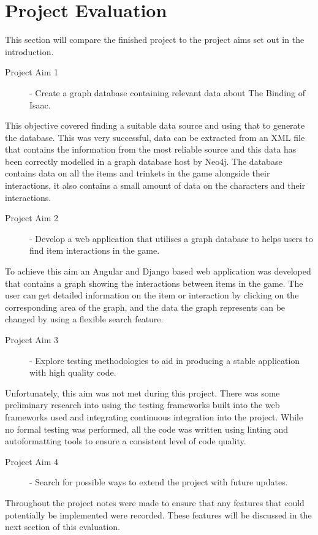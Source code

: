 \section{Project Evaluation}
This section will compare the finished project to the project aims set out in the introduction.
\begin{description}
    \item[Project Aim 1] - Create a graph database containing relevant data about The Binding of Isaac.
\end{description}
This objective covered finding a suitable data source and using that to generate the database. This was very successful, data can be 
extracted from an XML file that contains the information from the most reliable source and this data has been correctly modelled in 
a graph database host by Neo4j. The database contains data on all the items and trinkets in the game alongside their interactions, it also 
contains a small amount of data on the characters and their interactions.
\begin{description}
    \item[Project Aim 2] - Develop a web application that utilises a graph database to helps users to find item interactions in the game.
\end{description}
To achieve this aim an Angular and Django based web application was developed that contains a graph showing the interactions between items in the game. 
The user can get detailed information on the item or interaction by clicking on the corresponding area of the graph, and the data the graph represents can be 
changed by using a flexible search feature.
\begin{description}
    \item[Project Aim 3] - Explore testing methodologies to aid in producing a stable application with high quality code.
\end{description}
Unfortunately, this aim was not met during this project. There was some preliminary research into using the testing frameworks built into the 
web frameworks used and integrating continuous integration into the project. While no formal testing was performed, all the code was written 
using linting and autoformatting tools to ensure a consistent level of code quality.
\begin{description}
    \item[Project Aim 4] - Search for possible ways to extend the project with future updates.
\end{description}
Throughout the project notes were made to ensure that any features that could potentially be implemented were recorded. These features will 
be discussed in the next section of this evaluation.
